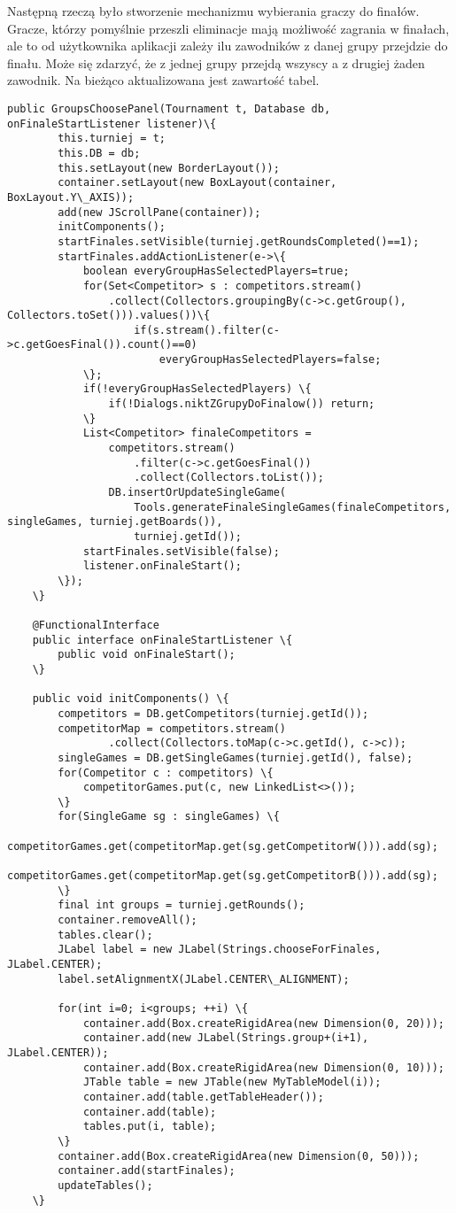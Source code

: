 Następną rzeczą było stworzenie mechanizmu wybierania graczy do finałów. Gracze, którzy pomyślnie przeszli eliminacje mają możliwość zagrania w finałach, ale to od użytkownika aplikacji zależy ilu zawodników z danej grupy przejdzie do finału. Może się zdarzyć, że z jednej grupy przejdą wszyscy a z drugiej żaden zawodnik. Na bieżąco aktualizowana jest zawartość tabel.
\begin{verbatim}
public GroupsChoosePanel(Tournament t, Database db, onFinaleStartListener listener)\{
		this.turniej = t;
		this.DB = db;
		this.setLayout(new BorderLayout());
		container.setLayout(new BoxLayout(container, BoxLayout.Y\_AXIS));
		add(new JScrollPane(container));
		initComponents();
		startFinales.setVisible(turniej.getRoundsCompleted()==1);
		startFinales.addActionListener(e->\{
			boolean everyGroupHasSelectedPlayers=true;
			for(Set<Competitor> s : competitors.stream()
				.collect(Collectors.groupingBy(c->c.getGroup(), Collectors.toSet())).values())\{
					if(s.stream().filter(c->c.getGoesFinal()).count()==0)
						everyGroupHasSelectedPlayers=false;
			\};
			if(!everyGroupHasSelectedPlayers) \{
				if(!Dialogs.niktZGrupyDoFinalow()) return;			
			\}
			List<Competitor> finaleCompetitors = 
				competitors.stream()
					.filter(c->c.getGoesFinal())
					.collect(Collectors.toList());
				DB.insertOrUpdateSingleGame(
					Tools.generateFinaleSingleGames(finaleCompetitors, singleGames, turniej.getBoards()), 
					turniej.getId());
			startFinales.setVisible(false);
			listener.onFinaleStart();
		\});
	\}
	
	@FunctionalInterface 
	public interface onFinaleStartListener \{
		public void onFinaleStart();
	\}
	
	public void initComponents() \{
		competitors = DB.getCompetitors(turniej.getId());
		competitorMap = competitors.stream()
				.collect(Collectors.toMap(c->c.getId(), c->c));
		singleGames = DB.getSingleGames(turniej.getId(), false);
		for(Competitor c : competitors) \{
			competitorGames.put(c, new LinkedList<>());
		\}
		for(SingleGame sg : singleGames) \{
			competitorGames.get(competitorMap.get(sg.getCompetitorW())).add(sg);
			competitorGames.get(competitorMap.get(sg.getCompetitorB())).add(sg);
		\}
		final int groups = turniej.getRounds();
		container.removeAll();
		tables.clear();
		JLabel label = new JLabel(Strings.chooseForFinales, JLabel.CENTER);
		label.setAlignmentX(JLabel.CENTER\_ALIGNMENT);
        
		for(int i=0; i<groups; ++i) \{
			container.add(Box.createRigidArea(new Dimension(0, 20)));
			container.add(new JLabel(Strings.group+(i+1), JLabel.CENTER));
			container.add(Box.createRigidArea(new Dimension(0, 10)));
			JTable table = new JTable(new MyTableModel(i));
			container.add(table.getTableHeader());
			container.add(table);
			tables.put(i, table);
		\}
		container.add(Box.createRigidArea(new Dimension(0, 50)));
		container.add(startFinales);
		updateTables();
	\}	
	

\end{verbatim}
